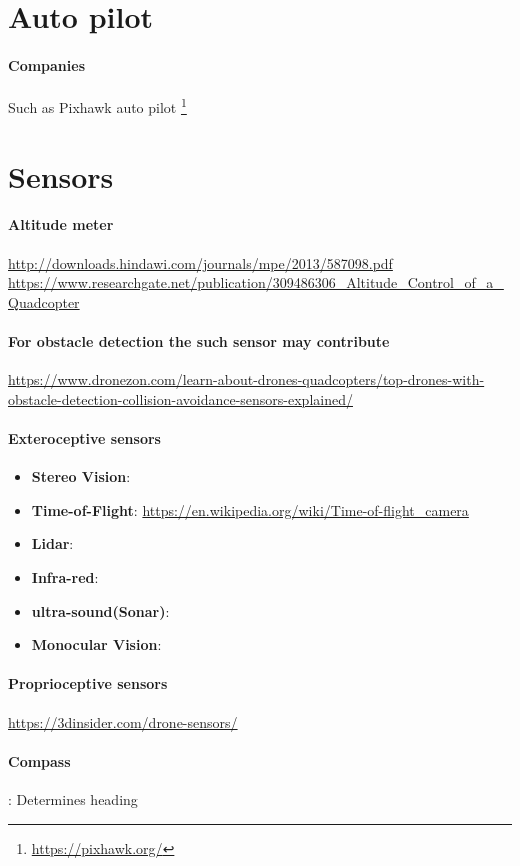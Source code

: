 \documentclass{article}
\begin{document}
	
	\section{Auto pilot}
		\paragraph{Companies}
		Such as Pixhawk auto pilot  \footnote{\url{https://pixhawk.org/}}
	\section{Sensors}
		\paragraph{Altitude meter}
		\url{http://downloads.hindawi.com/journals/mpe/2013/587098.pdf}
		\url{https://www.researchgate.net/publication/309486306_Altitude_Control_of_a_Quadcopter}
		\paragraph{For obstacle detection the such sensor may contribute}
		\url{https://www.dronezon.com/learn-about-drones-quadcopters/top-drones-with-obstacle-detection-collision-avoidance-sensors-explained/}
		\paragraph{Exteroceptive sensors}
			\begin{itemize}
				\item \textbf{Stereo Vision}:
				\item \textbf{Time-of-Flight}: \url{https://en.wikipedia.org/wiki/Time-of-flight_camera}
				\item \textbf{Lidar}:
				\item \textbf{Infra-red}:
				\item \textbf{ultra-sound(Sonar)}:
				\item \textbf{Monocular Vision}:
			\end{itemize}
		\paragraph{Proprioceptive sensors}
			\url{https://3dinsider.com/drone-sensors/}
			
			\paragraph{Compass}: Determines heading
\end{document}
